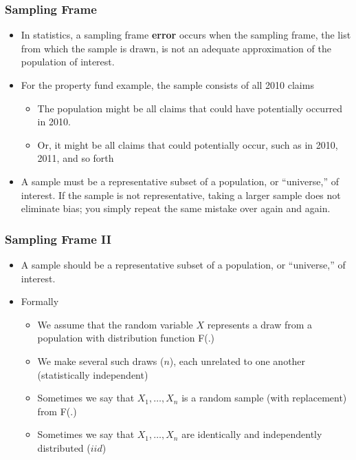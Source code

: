 \documentclass{beamer}
\begin{document}
\begin{frame}[shrink=2]
\frametitle{Sampling Frame}
\begin{itemize}
\item In statistics, a sampling frame \textbf{error} occurs when the sampling frame, the list from which the
sample is drawn, is not an adequate approximation of the population of interest.
\item For the property fund example, the sample consists of all 2010 claims
\begin{itemize}\item The population might be all claims that could have potentially occurred in 2010.
\item Or, it might be all claims that could potentially occur, such as in 2010, 2011, and so forth\end{itemize}
\item A sample must be a representative subset of a  population, or ``universe,'' of interest. If the sample is not representative, taking a larger sample does not eliminate bias; you simply repeat the same mistake over again and again.
\end{itemize}
\end{frame}

\begin{frame}[shrink=2]
\frametitle{Sampling Frame II}
\begin{itemize}
\item A sample should be a representative subset of a population, or ``universe,'' of interest.
\item Formally
\begin{itemize}
\item We assume that the random variable $X$ represents a draw from a population with distribution function F(.)
\item We make several such draws ($n$), each unrelated to one another (statistically independent)
\item Sometimes we say that $X_1, \ldots, X_n$ is a random sample (with replacement) from F(.)
\item Sometimes we say that $X_1, \ldots, X_n$ are identically and independently distributed ($iid$)
\end{itemize}\end{itemize}
\end{frame}
\end{document}
